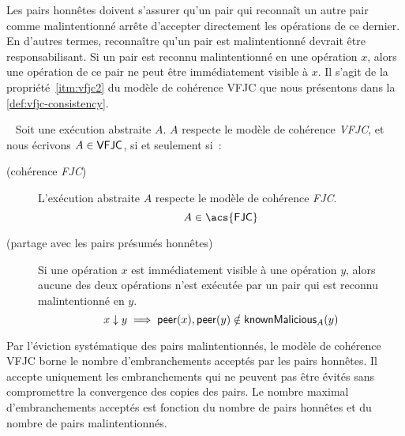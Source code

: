 Les pairs honnêtes doivent s'assurer qu'un pair qui reconnaît un autre pair comme malintentionné arrête d'accepter directement les opérations de ce dernier.
En d'autres termes, reconnaître qu'un pair est malintentionné devrait être responsabilisant.
Si un pair est reconnu malintentionné en une opération $x$, alors une opération de ce pair ne peut être immédiatement visible à $x$.
Il s'agit de la propriété~\ref{itm:vfjc2} du modèle de cohérence \acf{VFJC} que nous présentons dans la \autoref{def:vfjc-consistency}.

\begin{definition}\label{def:vfjc-consistency}~\autocite{mahajan_2011_cac}
  Soit une exécution abstraite $A$. $A$ respecte le modèle de cohérence \emph{\acf{VFJC}}, et nous écrivons $A \in \operatorname{\mathsf{VFJC}}$, si et seulement si~:

  \begin{description}
  \item[ (cohérence \emph{\acl{FJC}})]
  L'exécution abstraite $A$ respecte le modèle de cohérence \emph{\ac{FJC}}.
  \begin{equation*}
    A \in \trm{\acs{FJC}}
  \end{equation*}

  \item[ (partage avec les pairs présumés honnêtes)]
  Si une opération $x$ est immédiatement visible à une opération $y$, alors aucune des deux opérations n'est exécutée par un pair qui est reconnu malintentionné en $y$.
  \begin{equation*}
    x \downarrow y \implies \operatorname{\mathsf{peer}}(x), \operatorname{\mathsf{peer}}(y) \notin \operatorname{\mathsf{knownMalicious}}_A(y)
  \end{equation*}
  \end{description}
\end{definition}

Par l'éviction systématique des pairs malintentionnés, le modèle de cohérence \ac{VFJC} borne le nombre d'embranchements acceptés par les pairs honnêtes.
Il accepte uniquement les embranchements qui ne peuvent pas être évités sans compromettre la convergence des copies des pairs.
Le nombre maximal d'embranchements acceptés est fonction du nombre de pairs honnêtes et du nombre de pairs malintentionnés.


